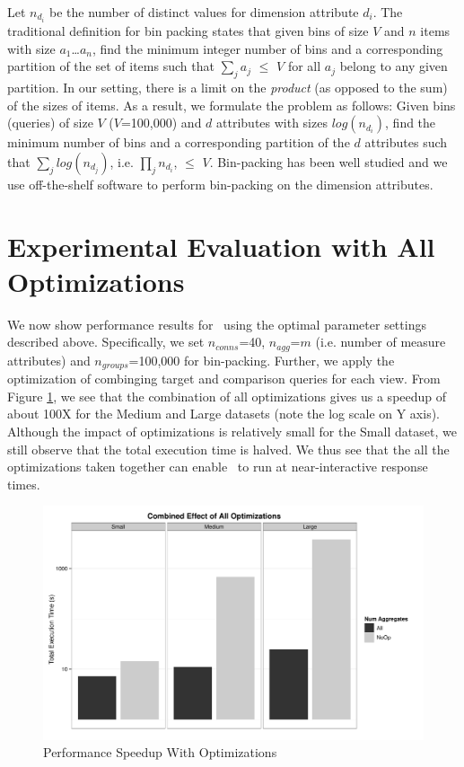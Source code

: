 Let $n_{d_{i}}$ be the number of distinct values for dimension attribute $d_i$.
The traditional definition for bin packing states that given bins of size $V$
and $n$ items with size $a_1$\ldots$a_n$, find the minimum integer number of
bins and a corresponding partition of the set of items such that $\sum_{j} a_j$
$\leq$ $V$ for all $a_j$ belong to any given partition. In our setting, there is
a limit on the {\it product} (as opposed to the sum) of the sizes of items. As a
result, we formulate the problem as follows: Given bins (queries) of size $V$
($V$=100,000) and $d$ attributes with sizes $log(n_{d_{i}})$, find
the minimum number of bins and a corresponding partition of the $d$ attributes
such that $\sum_{j} log(n_{d_{j}})$, i.e. $\prod_{j} n_{d_{i}}$, $\leq$ $V$.
Bin-packing has been well studied and we use off-the-shelf software
\cite{glpk} to perform bin-packing on the dimension attributes.

\section{Experimental Evaluation with All Optimizations}

We now show performance results for \SeeDB\ using the optimal parameter settings
described above. Specifically, we set $n_{conns}$=40, $n_{agg}$=$m$ (i.e.
number of measure attributes) and $n_{groups}$=100,000 for bin-packing. Further,
we apply the optimization of combinging target and comparison queries for each view. From
Figure \ref{fig:total_speed_up}, we see that the combination of all
optimizations gives us a speedup of about 100X for the Medium and Large
datasets (note the log scale on Y axis). Although the impact of optimizations is
relatively small for the Small dataset, we still observe that the total
execution time is halved. We thus see that the all the optimizations
taken together can enable \SeeDB\ to run at near-interactive response times.

\begin{figure}[h]
  \centering
    \includegraphics[width=12cm]{Images/total_speedup.pdf}
  \caption{Performance Speedup With Optimizations} 
  \label{fig:total_speed_up}
\end{figure}


